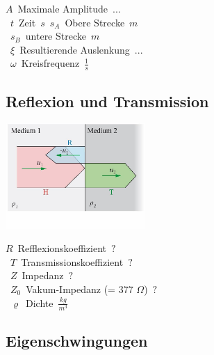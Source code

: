 \unit{$A$}{Maximale Amplitude}{$...$}\\
\unit{$t$}{Zeit}{$s$}
\unit{$s_{A}$}{Obere Strecke}{$m$}\\
\unit{$s_{B}$}{untere Strecke}{$m$}\\
\unit{$\xi$}{Resultierende Auslenkung}{$...$}\\
\unit{$\omega$}{Kreisfrequenz}{$\frac{1}{s}$}\\







\subsection{Reflexion und Transmission}
\begin{center}
	\begin{minipage}{0.3\textwidth}
	\end{minipage}%
	\begin{minipage}{0.2\textwidth}
		\includegraphics[height=4cm,keepaspectratio=true]{Images/reflexion_und_transmission.png}
	\end{minipage}
\end{center}
\unit{$R$}{Refflexionskoeffizient}{$?$}\\
\unit{$T$}{Transmissionskoeffizient}{$?$}\\
\unit{$Z$}{Impedanz}{$?$}\\
\unit{$Z_0$}{Vakum-Impedanz (= 377 $\Omega$)}{$?$}\\
\unit{$\varrho$}{Dichte}{$\frac{kg}{m^3}$}





\subsection{Eigenschwingungen}
